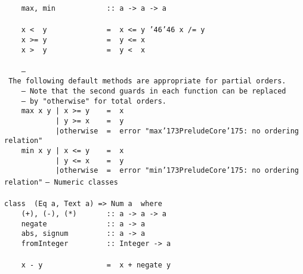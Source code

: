 \mbox{\tt \ \ \ \ max,\ min\ \ \ \ \ \ \ \ \ \ \ \ ::\ a\ ->\ a\ ->\ a}\\
\mbox{\tt }\\[-8pt]
\mbox{\tt \ \ \ \ x\ <\ \ y\ \ \ \ \ \ \ \ \ \ \ \ \ \ =\ \ x\ <=\ y\ {\char'46}{\char'46}\ x\ /=\ y}\\
\mbox{\tt \ \ \ \ x\ >=\ y\ \ \ \ \ \ \ \ \ \ \ \ \ \ =\ \ y\ <=\ x}\\
\mbox{\tt \ \ \ \ x\ >\ \ y\ \ \ \ \ \ \ \ \ \ \ \ \ \ =\ \ y\ <\ \ x}\\
\mbox{\tt }\\[-8pt]
\mbox{\tt \ \ \ \ --\ The\ following\ default\ methods\ are\ appropriate\ for\ partial\ orders.}\\
\mbox{\tt \ \ \ \ --\ Note\ that\ the\ second\ guards\ in\ each\ function\ can\ be\ replaced}\\
\mbox{\tt \ \ \ \ --\ by\ "otherwise"\ for\ total\ orders.}\\
\mbox{\tt \ \ \ \ max\ x\ y\ |\ x\ >=\ y\ \ \ \ =\ \ x}\\
\mbox{\tt \ \ \ \ \ \ \ \ \ \ \ \ |\ y\ >=\ x\ \ \ \ =\ \ y}\\
\mbox{\tt \ \ \ \ \ \ \ \ \ \ \ \ |otherwise\ \ =\ \ error\ "max{\char'173}PreludeCore{\char'175}:\ no\ ordering\ relation"}\\
\mbox{\tt \ \ \ \ min\ x\ y\ |\ x\ <=\ y\ \ \ \ =\ \ x}\\
\mbox{\tt \ \ \ \ \ \ \ \ \ \ \ \ |\ y\ <=\ x\ \ \ \ =\ \ y}\\
\mbox{\tt \ \ \ \ \ \ \ \ \ \ \ \ |otherwise\ \ =\ \ error\ "min{\char'173}PreludeCore{\char'175}:\ no\ ordering\ relation"}
%
%
%
%
%
%
%
%
\eprogB\noindent\bprogB
\mbox{\tt --\ Numeric\ classes}\\
\mbox{\tt }\\[-8pt]
\mbox{\tt class\ \ (Eq\ a,\ Text\ a)\ =>\ Num\ a\ \ where}\\
\mbox{\tt \ \ \ \ (+),\ (-),\ (*)\ \ \ \ \ \ \ ::\ a\ ->\ a\ ->\ a}\\
\mbox{\tt \ \ \ \ negate\ \ \ \ \ \ \ \ \ \ \ \ \ \ ::\ a\ ->\ a}\\
\mbox{\tt \ \ \ \ abs,\ signum\ \ \ \ \ \ \ \ \ ::\ a\ ->\ a}\\
\mbox{\tt \ \ \ \ fromInteger\ \ \ \ \ \ \ \ \ ::\ Integer\ ->\ a}\\
\mbox{\tt }\\[-8pt]
\mbox{\tt \ \ \ \ x\ -\ y\ \ \ \ \ \ \ \ \ \ \ \ \ \ \ =\ \ x\ +\ negate\ y}
